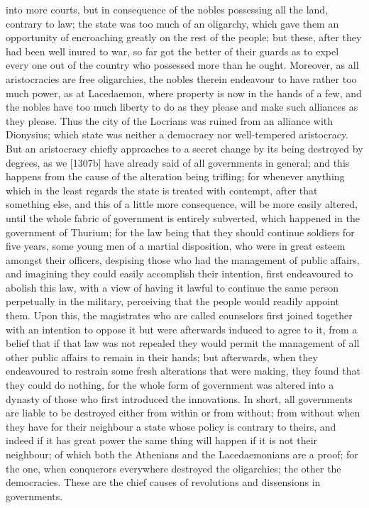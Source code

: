 \documentclass[12pt]{article}
\begin{document}
into more courts, but in consequence of the nobles possessing all the land, contrary to law; the state was too much of an oligarchy, which gave them an opportunity of encroaching greatly on the rest of the people; but these, after they had been well inured to war, so far got the better of their guards as to expel every one out of the country who possessed more than he ought. Moreover, as all aristocracies are free oligarchies, the nobles therein endeavour to have rather too much power, as at Lacedaemon, where property is now in the hands of a few, and the nobles have too much liberty to do as they please and make such alliances as they please. Thus the city of the Locrians was ruined from an alliance with Dionysius; which state was neither a democracy nor well-tempered aristocracy. But an aristocracy chiefly approaches to a secret change by its being destroyed by degrees, as we [1307b] have already said of all governments in general; and this happens from the cause of the alteration being trifling; for whenever anything which in the least regards the state is treated with contempt, after that something else, and this of a little more consequence, will be more easily altered, until the whole fabric of government is entirely subverted, which happened in the government of Thurium; for the law being that they should continue soldiers for five years, some young men of a martial disposition, who were in great esteem amongst their officers, despising those who had the management of public affairs, and imagining they could easily accomplish their intention, first endeavoured to abolish this law, with a view of having it lawful to continue the same person perpetually in the military, perceiving that the people would readily appoint them. Upon this, the magistrates who are called counselors first joined together with an intention to oppose it but were afterwards induced to agree to it, from a belief that if that law was not repealed they would permit the management of all other public affairs to remain in their hands; but afterwards, when they endeavoured to restrain some fresh alterations that were making, they found that they could do nothing, for the whole form of government was altered into a dynasty of those who first introduced the innovations. In short, all governments are liable to be destroyed either from within or from without; from without when they have for their neighbour a state whose policy is contrary to theirs, and indeed if it has great power the same thing will happen if it is not their neighbour; of which both the Athenians and the Lacedaemonians are a proof; for the one, when conquerors everywhere destroyed the oligarchies; the other the democracies. These are the chief causes of revolutions and dissensions in governments.
\end{document}
